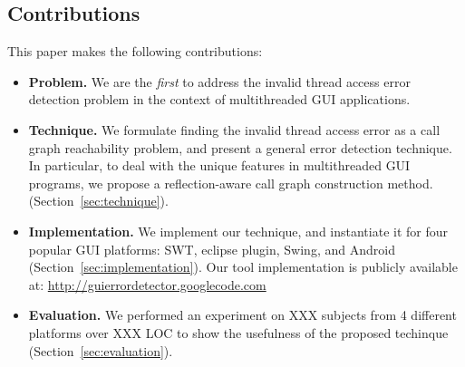 \subsection{Contributions}

This paper makes the following contributions:

\begin{itemize}
\item \textbf{Problem.} We are the \textit{first} to address
the invalid thread access error detection problem in the context of multithreaded GUI applications.

\item \textbf{Technique.} We formulate finding
the invalid thread access error as a call graph reachability problem,
and present a general error detection technique.
In particular, to deal with the unique features in
multithreaded GUI programs, we propose a reflection-aware
call graph construction method. (Section~\ref{sec:technique}).

\item \textbf{Implementation.} We implement our technique, and
instantiate it for four
popular GUI platforms: SWT, eclipse plugin, Swing, and Android (Section~\ref{sec:implementation}). Our
tool implementation is publicly available at:
\url{http://guierrordetector.googlecode.com}

\item \textbf{Evaluation.} We performed an experiment on XXX subjects
from 4 different platforms over XXX LOC to show the usefulness
of the proposed techinque (Section~\ref{sec:evaluation}).

\end{itemize}

